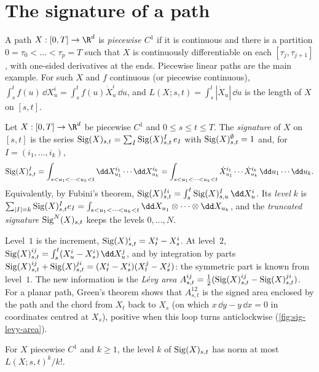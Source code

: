 \section{The signature of a path}\label{sec:sig-signature}

A path $X:[0,T]\to\R^d$ is \emph{piecewise $C^1$} if it is continuous and there is a partition
$0=\tau_0<\dots<\tau_p=T$ such that $X$ is continuously differentiable on each $[\tau_j,\tau_{j+1}]$, with
one-sided derivatives at the ends. Piecewise linear paths are the main example. For such $X$ and $f$
continuous (or piecewise continuous), $\int_s^tf(u)\,\dd X^i_u=\int_s^tf(u)\dot X^i_u\,\dd u$, and
$L(X;s,t)=\int_s^t|\dot X_u|\,\dd u$ is the length of $X$ on $[s,t]$.

\begin{definition}[Signature]\label{def:sig-signature}
Let $X:[0,T]\to\R^d$ be piecewise $C^1$ and $0\le s\le t\le T$. The \emph{signature} of $X$ on $[s,t]$ is
the series $\operatorname{Sig}(X)_{s,t}=\sum_I\operatorname{Sig}(X)^I_{s,t}\,e_I$ with $\operatorname{Sig}(X)^\emptyset_{s,t}=1$ and, for
$I=(i_1,\dots,i_k)$,
\[
  \sigSig(X)^I_{s,t}=\int_{s<u_1<\dots<u_k<t}\dd X^{i_1}_{u_1}\cdots\dd X^{i_k}_{u_k}
  =\int_{s<u_1<\dots<u_k<t}\dot X^{i_1}_{u_1}\cdots\dot X^{i_k}_{u_k}\,\dd u_1\cdots\dd u_k .
\]
Equivalently, by Fubini's theorem, $\sigSig(X)^{Ii}_{s,t}=\int_s^t\sigSig(X)^I_{s,u}\,\dd X^i_u$. Its
\emph{level} $k$ is $\sum_{|I|=k}\sigSig(X)^I_{s,t}e_I=\int_{s<u_1<\dots<u_k<t}\dd X_{u_1}\otimes\dots\otimes\dd X_{u_k}$,
and the \emph{truncated signature} $\operatorname{Sig}^N(X)_{s,t}$ keeps the levels $0,\dots,N$.
\end{definition}

Level~$1$ is the increment, $\operatorname{Sig}(X)^i_{s,t}=X^i_t-X^i_s$. At level~$2$,
$\sigSig(X)^{ij}_{s,t}=\int_s^t(X^i_u-X^i_s)\,\dd X^j_u$, and by integration by parts
$\operatorname{Sig}(X)^{ij}_{s,t}+\operatorname{Sig}(X)^{ji}_{s,t}=(X^i_t-X^i_s)(X^j_t-X^j_s)$: the symmetric part is known from
level~$1$. The new information is the \emph{L\'evy area}
$A^{ij}_{s,t}=\frac12(\operatorname{Sig}(X)^{ij}_{s,t}-\operatorname{Sig}(X)^{ji}_{s,t})$. For a planar path, Green's theorem shows that
$A^{12}_{s,t}$ is the signed area enclosed by the path and the chord from $X_t$ back to $X_s$ (on which
$x\,\dd y-y\,\dd x=0$ in coordinates centred at $X_s$), positive when this loop turns anticlockwise
(\cref{fig:sig-levy-area}).

\begin{lemma}\label{lem:sig-decay}
For $X$ piecewise $C^1$ and $k\ge1$, the level $k$ of $\operatorname{Sig}(X)_{s,t}$ has norm at most $L(X;s,t)^k/k!$.
\end{lemma}

